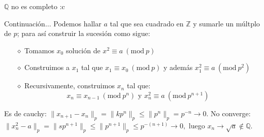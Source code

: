\documentclass{beamer}
\theoremstyle{definition}
\numberwithin{equation}{section}
\newcommand{\Mod}[1]{\ (\mathrm{mod}\ #1)}
\renewcommand{\leq}{\leqslant}
\newcommand{\Z}{\mathbb{Z}}
\newcommand{\Q}{\mathbb{Q}}
\newcommand{\pnorm}[1]{\|#1\|_p}
\begin{document}
\begin{frame}{$\Q$ no es completo :c}
	\begin{exampleblock}{Continuación$\dots$}
		Podemos hallar $a$ tal que sea cuadrado en $\Z$ y sumarle un múltplo de $p$; para así construir la sucesión como sigue:
		\begin{itemize}[<+- | alert@+>]
			\item[$\diamond$] Tomamos $x_0$ solución de $x^2\equiv a \Mod{p}$
			\item[$\diamond$] Construimos a $x_1$ tal que $x_1 \equiv x_0 \Mod{p}$ y además ${x_1^2\equiv a \Mod{p^2}}$ 
			\item[$\diamond$] Recursivamente, construimos $x_n$ tal que:
			$$x_n \equiv x_{n-1} \Mod{p^n} \text{ y } {x_n^2\equiv a \Mod{p^{n+1}}}$$
		\end{itemize}
	Es de cauchy: $  \pnorm{x_{n+1}-x_n} = \pnorm{kp^n} \leq \pnorm{p^n}=p^{-n}\rightarrow0.$\linebreak
	No converge: $\pnorm{x_n^2-a}=\pnorm{sp^{n+1}}\leq \pnorm{p^{n+1}}\leq p^{- (n+1)}\to 0,$
	luego $x_n\to \sqrt{a}\notin\Q$.
	\end{exampleblock}
\end{frame}
\end{document}
